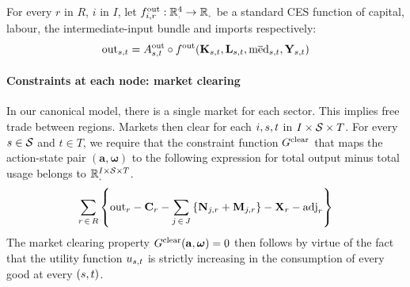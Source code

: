 \documentclass[12pt,a4paper,twoside, draft]{article}
\begin{document}
For every $r$ in $R$, $i$ in $I$, let
$f_{i, r}^{\textup{out}}: \nnreal^{4} \rightarrow \nnreal$ be a standard
CES function of capital, labour, the intermediate-input bundle and imports
respectively:
\begin{equation}
	\textup{out}_{{s}, t}
    = A_{{s}, t}^{\textup{out}} \circ f ^ \textup{out}(
        \mathbf{K}_{{s}, t},
        \mathbf{L}_{{s}, t},
        \textup{m}\overline{\textup{e}}\textup{d}_{{s}, t},
        \mathbf{Y}_{{s}, t}
        )
\end{equation}
\paragraph{Constraints at each node: market clearing}
In our canonical model, there is a single market for each sector.
This implies free trade between regions.
Markets then clear for each $i, {s}, t $ in $I\times \mathcal{S} \times T$.
For every ${s} \in \mathcal{S}$ and $t \in T$, we require that
the constraint function $G^{\textup{clear}}$ that maps the action-state pair
$(\mathbf{a}, \boldsymbol{\omega})$
to the following expression for total output minus total usage belongs to
$\nnreal^{I \times \nodes \times T}$.
\begin{equation}\label{eq-market-clearing}
  \sum_{r \,\in\, R} \left\{
  \textup{out}_{r}
  - \mathbf{C}_{r}
  - \sum_{j \,\in\, J}
      \left\{\mathbf{N}_{j, r} + \mathbf{M}_{j, r}\right\}
  - \mathbf{X}_{r}
  - \textup{adj}_{r} \right\}
\end{equation}
The market clearing property $G^{\textup{clear}}(\mathbf{a},
\boldsymbol{\omega})=0$ then follows by virtue of the fact that
the utility function $u_{{s}, t}$ is strictly increasing in the
consumption of every good at every $({s}, t)$.
\end{document}
